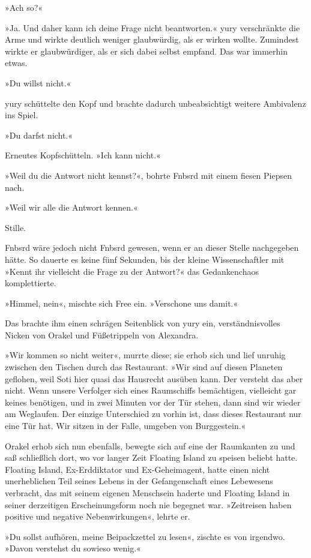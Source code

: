 »Ach so?«

»Ja. Und daher kann ich deine Frage nicht beantworten.« yury verschränkte die Arme und wirkte deutlich weniger glaubwürdig, als er wirken wollte. Zumindest wirkte er glaubwürdiger, als er sich dabei selbst empfand. Das war immerhin etwas.

»Du willst nicht.«

yury schüttelte den Kopf und brachte dadurch unbeabsichtigt weitere Ambivalenz ins Spiel.

»Du darfst nicht.«

Erneutes Kopfschütteln. »Ich kann nicht.«

»Weil du die Antwort nicht kennst?«, bohrte Fnbsrd mit einem fiesen Piepsen nach.

»Weil wir alle die Antwort kennen.«

Stille.

Fnbsrd wäre jedoch nicht Fnbsrd gewesen, wenn er an dieser Stelle nachgegeben hätte. So dauerte es keine fünf Sekunden, bis der kleine Wissenschaftler mit »Kennt ihr vielleicht die Frage zu der Antwort?« das Gedankenchaos komplettierte.

»Himmel, nein«, mischte sich Free ein. »Verschone uns damit.«

Das brachte ihm einen schrägen Seitenblick von yury ein, verständnisvolles Nicken von Orakel und Füßetrippeln von Alexandra.

»Wir kommen so nicht weiter«, murrte diese; sie erhob sich und lief unruhig zwischen den Tischen durch das Restaurant. »Wir sind auf diesen Planeten geflohen, weil Soti hier quasi das Hausrecht ausüben kann. Der versteht das aber nicht. Wenn unsere Verfolger sich eines Raumschiffs bemächtigen, vielleicht gar keines benötigen, und in zwei Minuten vor der Tür stehen, dann sind wir wieder am Weglaufen. Der einzige Unterschied zu vorhin ist, dass dieses Restaurant nur eine Tür hat. Wir sitzen in der Falle, umgeben von Burggestein.«

Orakel erhob sich nun ebenfalls, bewegte sich auf eine der Raumkanten zu und saß schließlich dort, wo vor langer Zeit Floating Island zu speisen beliebt hatte. Floating Island, Ex-Erddiktator und Ex-Geheimagent, hatte einen nicht unerheblichen Teil seines Lebens in der Gefangenschaft eines Lebewesens verbracht, das mit seinem eigenen Menschsein haderte und Floating Island in seiner derzeitigen Erscheinungsform noch nie begegnet war. »Zeitreisen haben positive und negative Nebenwirkungen«, lehrte er.

»Du sollst aufhören, meine Beipackzettel zu lesen«, zischte es von irgendwo. »Davon verstehst du sowieso wenig.«

